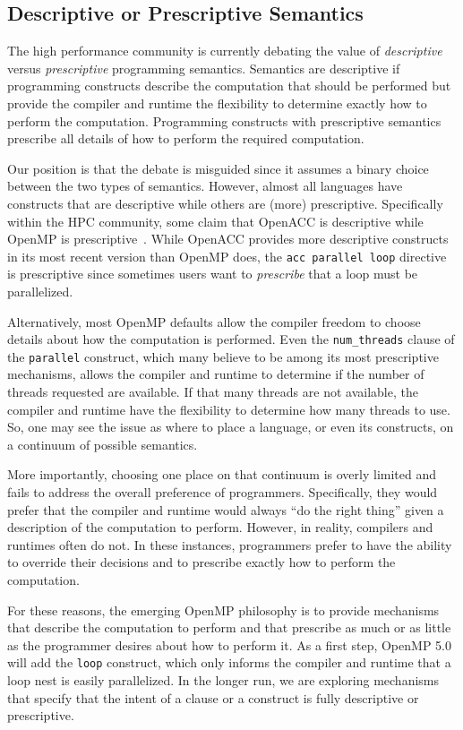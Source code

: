 \subsection{Descriptive or Prescriptive Semantics}
\label{sub:descriptive}

The high performance community is currently debating the value of 
\emph{descriptive} versus \emph{prescriptive} programming semantics. 
Semantics are descriptive if programming constructs describe the 
computation that should be performed but provide the compiler and 
runtime the flexibility to determine exactly how to perform the 
computation. Programming constructs with prescriptive semantics 
prescribe all details of how to perform the required computation.

Our position is that the debate is misguided since it assumes a binary 
choice between the two types of semantics. However, almost all languages 
have constructs that are descriptive while others are (more) prescriptive. 
Specifically within the HPC community, some claim that OpenACC is descriptive 
while OpenMP is prescriptive~\cite{juckeland2016isc,wolfe16descriptive}. 
While OpenACC provides more descriptive constructs in its most recent version 
than OpenMP does, the \texttt{acc parallel loop} directive is prescriptive 
since sometimes users want to \emph{prescribe} that a loop must be parallelized. 

Alternatively, most OpenMP defaults allow the compiler freedom
to choose details about how the computation is performed. Even
the \texttt{num\_threads} clause of the \texttt{parallel} construct,
which many believe to be among its most prescriptive mechanisms,
allows the compiler and runtime to determine if the number of
threads requested are available. If that many threads are not
available, the compiler and runtime have the flexibility to
determine how many threads to use. So, one may see the issue 
as where to place a language, or even its constructs, on a 
continuum of possible semantics.

More importantly, choosing one place on that continuum is overly
limited and fails to address the overall preference of programmers. 
Specifically, they would prefer that the compiler and runtime would 
always ``do the right thing'' given a description of the computation 
to perform. However, in reality, compilers and runtimes often do not. 
In these instances, programmers prefer to have the ability to override 
their decisions and to prescribe exactly how to perform the computation.

For these reasons, the emerging OpenMP philosophy is to provide
mechanisms that describe the computation to perform and that
prescribe as much or as little as the programmer desires about
how to perform it. As a first step, OpenMP 5.0 will add the 
\texttt{loop} construct, which only informs the compiler 
and runtime that a loop nest is easily parallelized. In the 
longer run, we are exploring mechanisms that specify that the 
intent of a clause or a construct is fully descriptive or prescriptive.
